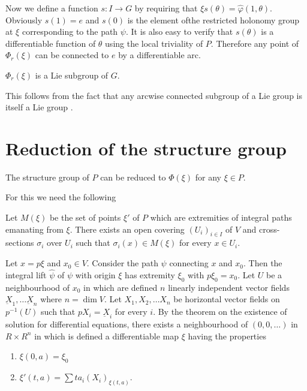 Now we define a function $s : I \to G$ by requiring that $\xi
s(\theta) = \hat{\varphi} (1, \theta)$. Obviously $s(1) =e$ and $s(0)$
is the element of\pageoriginale the restricted holonomy group at $\xi$ corresponding
to the path $\psi$. It is also easy to verify that $s(\theta)$ is a
differentiable function of $\theta$ using the local triviality of
$P$. Therefore any point of $\Phi_r (\xi)$ can be connected to $e$ by
a differentiable arc. 

\begin{coro*}%
  $\Phi_r (\xi)$ is a Lie subgroup of $G$.
\end{coro*}

This follows from the fact that any arcwise connected subgroup of a
Lie group is itself a Lie group \cite{31}. 

\section{Reduction of the structure group}\label{chap4:sec7}%

\begin{theorem}\label{chap4:sec7:thm4}%
\end{theorem}

The structure group of $P$ can be reduced to $\Phi (\xi)$ for any $\xi \in P$.

For this we need the following 

\setcounter{lem}{0}
\begin{lem}\label{chap4:sec7:lem1}%
  Let $M(\xi)$ be the set of points $\xi'$ of $P$ which are
  extremities of integral paths emanating from $\xi$. There exists an
  open covering $(U_i)_{i \in I} $ of $V$ and cross-sections
  $\sigma_i$ over $U_i$ such that $\sigma_i (x) \in M (\xi)$ for every
  $x \in U_i$. 

  Let $x = p \xi$ and $x_0 \in V$. Consider the path $\psi$ connecting
  $x$ and $x_0$. Then the integral lift $\hat{\psi}$ of $\psi$ with
  origin $\xi$ has extremity $\xi_0$ with $p \xi_0 = x_0$. Let $U$ be
  a neighbourhood of $x_0$ in which are defined $n$ linearly
  independent vector fields $\underbar{X}_1, \ldots \underbar{X}_n$
  where $n = \dim V$. Let $X_1 , X_2, \ldots X_n$ be horizontal vector
  fields on $p^{-1}(U)$ such that $pX_i =  \underbar{X}_i$ for every
  $i$. By the theorem on the existence of solution for differential
  equations, there exists a neighbourhood of $(0, 0, \ldots)$ in $R
  \times R^n$ in which is defined a differentiable map $\xi$ having
  the properties  
  
  \begin{enumerate}[1)]
  \item $\xi(0,a) = \xi_0$\pageoriginale
  \item $\xi'(t, a) = \sum t a_i (X_i)_{\xi (t, a)}$.
  \end{enumerate}
\end{lem}

